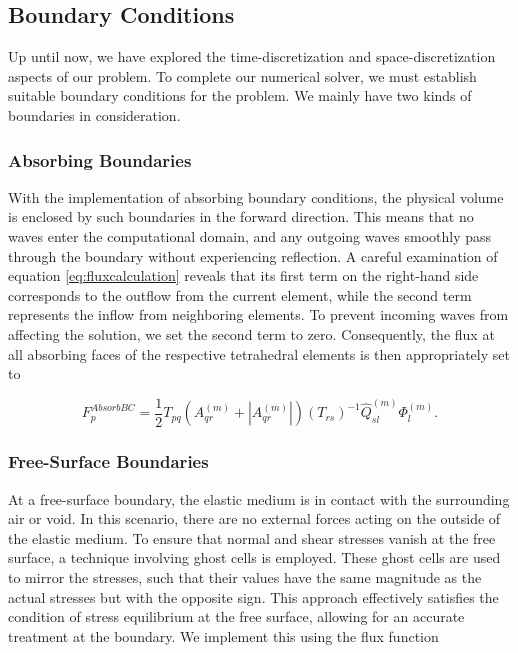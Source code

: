 \subsection{Boundary Conditions}
Up until now, we have explored the time-discretization and space-discretization aspects of our problem. To complete our numerical
solver, we must establish suitable boundary conditions for the problem. We mainly have two kinds of boundaries in consideration. 
\subsubsection{Absorbing Boundaries}
With the implementation of absorbing boundary conditions, the physical volume is enclosed by such boundaries in the forward direction. This means that no waves enter the computational domain, and any outgoing waves smoothly pass through the boundary without experiencing
reflection. A careful examination of equation \ref{eq:fluxcalculation} reveals that its first term on the right-hand side corresponds
to the outflow from the current element, while the second term represents the inflow from neighboring elements. To prevent incoming
waves from affecting the solution, we set the second term to zero. Consequently, the flux at all absorbing faces of the respective
tetrahedral elements is then appropriately set to

\begin{equation}
    F_p^{AbsorbBC} = \frac{1}{2} T_{pq} \left(A_{qr}^{\left(m\right)} + \left|A_{qr}^{\left(m\right)}\right|\right) \left(T_{rs}\right)^{-1} \hat{Q}_{sl}^{\left(m\right)} \Phi_l^{\left(m\right)}.
\end{equation}

\subsubsection{Free-Surface Boundaries}
At a free-surface boundary, the elastic medium is in contact with the surrounding air or void. In this scenario, there are no external forces
acting on the outside of the elastic medium. To ensure that normal and shear stresses vanish at the free surface, a technique involving
ghost cells is employed. These ghost cells are used to mirror the stresses, such that their values have the same magnitude as the actual
stresses but with the opposite sign. This approach effectively satisfies the condition of stress equilibrium at the free surface, allowing
for an accurate treatment at the boundary. We implement this using the flux function ~\parencite{dumbser1}

